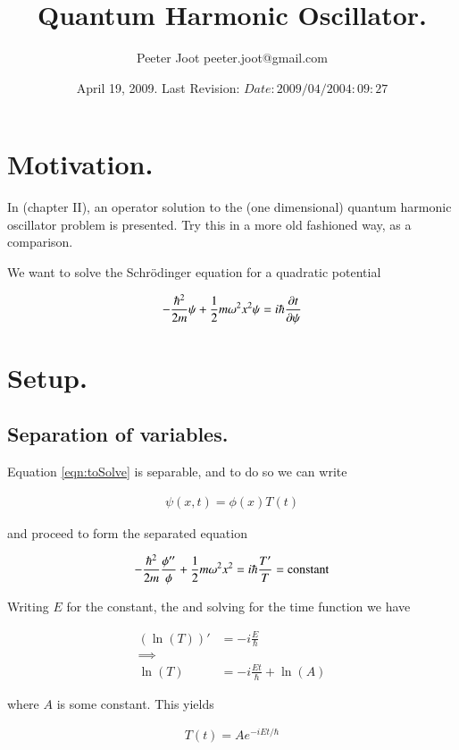 \documentclass{article}
\title{ Quantum Harmonic Oscillator. }
\author{Peeter Joot \quad peeter.joot@gmail.com }
\date{ April 19, 2009.  Last Revision: $Date: 2009/04/20 04:09:27 $ }
\begin{document}
\maketitle{}
\tableofcontents
\section{ Motivation. }

In \cite{byron1992mca} (chapter II), an operator solution to the
(one dimensional) quantum
harmonic oscillator problem is presented.  Try this in a more old fashioned way,
as a comparison.

We want to solve the Schr\"{o}dinger equation for a quadratic potential

\begin{align}\label{eqn:toSolve}
-\frac{\hbar^2}{2m} \psi + \frac{1}{2} m \omega^2 x^2 \psi = i \hbar \frac{\partial{t}}{\partial {\psi}}
\end{align}

\section{ Setup. }

\subsection{ Separation of variables. }

Equation \ref{eqn:toSolve} is separable, and to do so we can write

\begin{align*}
\psi(x,t) = \phi(x) T(t)
\end{align*}

and proceed to form the separated equation

\begin{align*}
-\frac{\hbar^2}{2m} \frac{\phi''}{\phi} + \frac{1}{2} m \omega^2 x^2 = i \hbar \frac{T'}{T} = \text{constant}
\end{align*}

Writing $E$ for the constant, the and solving for the time function we have

\begin{align*}
(\ln(T))' &= -i \frac{E}{\hbar} \\
\implies \\
\ln(T) &= -i \frac{Et}{\hbar} + \ln(A)
\end{align*}

where $A$ is some constant.  This yields

\begin{align*}
T(t) = A e^{ -i E t/\hbar }
\end{align*}
\end{document}
